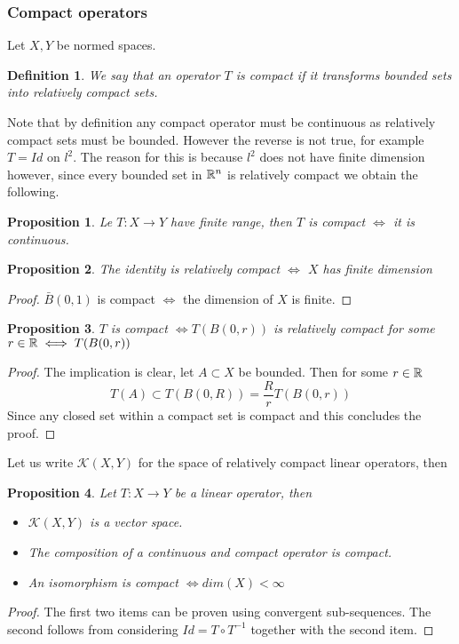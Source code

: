 \documentclass[12pt]{article}
\newtheorem{proposition}{Proposition}
\newtheorem{definition}{Definition}
\begin{document}
\subsubsection{Compact operators}
Let $X,Y$ be normed spaces.
\begin{definition}
	We say that an operator $T$ is compact if it transforms bounded sets into relatively compact sets.
\end{definition}
Note that by definition any compact operator must be continuous as relatively compact sets must be bounded. However the reverse is not true, for example $T=Id$ on $l^2$. The reason for this is because $l^2$ does not have finite dimension however, since every bounded set in ${\mathbb R}^n$ is relatively compact we obtain the following.
\begin{proposition}
	Le $T:X\to Y$ have finite range, then $T$ is compact $\iff$ it is continuous.
\end{proposition}
\begin{proposition}
	The identity is relatively compact $\iff$ $X$ has finite dimension
\end{proposition}
\begin{proof}
	$\bar{B}(0,1)$ is compact $\iff$ the dimension of $X$ is finite.
\end{proof}
\begin{proposition}
	$T$ is compact $\iff T(B(0,r))$ is relatively compact for some $r\in{\mathbb R}\iff T(B(0,r))$
\end{proposition}
\begin{proof}
	The implication is clear, let $A\subset X$ be bounded. Then for some $r\in{\mathbb R}$
	\begin{equation*}
		T(A)\subset T(B(0,R))=\frac{R}{r} T(B(0,r))
	\end{equation*}
	Since any closed set within a compact set is compact and this concludes the proof.
\end{proof}
Let us write $\mathcal{K}(X,Y)$ for the space of relatively compact linear operators, then
\begin{proposition}
	Let $T:X\to Y$ be a linear operator, then
	\begin{itemize}
		\item $\mathcal{K}(X,Y)$ is a vector space.
		\item The composition of a continuous and compact operator is compact.
		\item An isomorphism is compact $\iff dim(X)<\infty$
	\end{itemize}
\end{proposition}
\begin{proof}
	The first two items can be proven using convergent sub-sequences. The second follows from considering $Id=T\circ T^{-1}$ together with the second item.
\end{proof}
\end{document}
